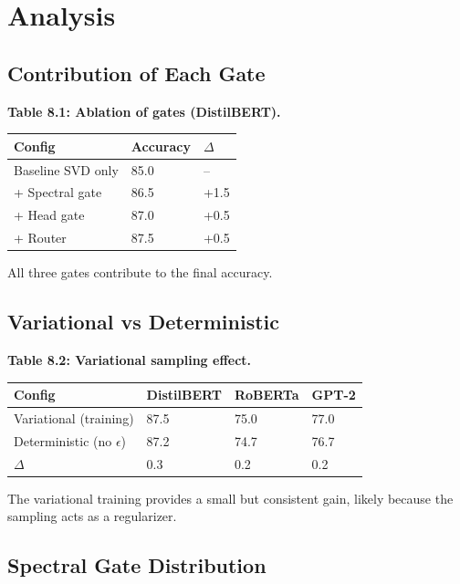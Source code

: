 \section{Analysis}

\subsection{Contribution of Each Gate}

\textbf{Table 8.1: Ablation of gates (DistilBERT).}

\begin{table}[H]
\centering
\small
\begin{tabular}{lll}
\toprule
\textbf{Config} & \textbf{Accuracy} & \textbf{$\Delta$} \\
\midrule
Baseline SVD only & 85.0 & -- \\
+ Spectral gate & 86.5 & +1.5 \\
+ Head gate & 87.0 & +0.5 \\
+ Router & 87.5 & +0.5 \\
\bottomrule
\end{tabular}
\end{table}

All three gates contribute to the final accuracy.

\subsection{Variational vs Deterministic}

\textbf{Table 8.2: Variational sampling effect.}

\begin{table}[H]
\centering
\small
\begin{tabular}{llll}
\toprule
\textbf{Config} & \textbf{DistilBERT} & \textbf{RoBERTa} & \textbf{GPT-2} \\
\midrule
Variational (training) & 87.5 & 75.0 & 77.0 \\
Deterministic (no $\epsilon$) & 87.2 & 74.7 & 76.7 \\
$\Delta$ & 0.3 & 0.2 & 0.2 \\
\bottomrule
\end{tabular}
\end{table}

The variational training provides a small but consistent gain, likely 
because the sampling acts as a regularizer.

\subsection{Spectral Gate Distribution}

